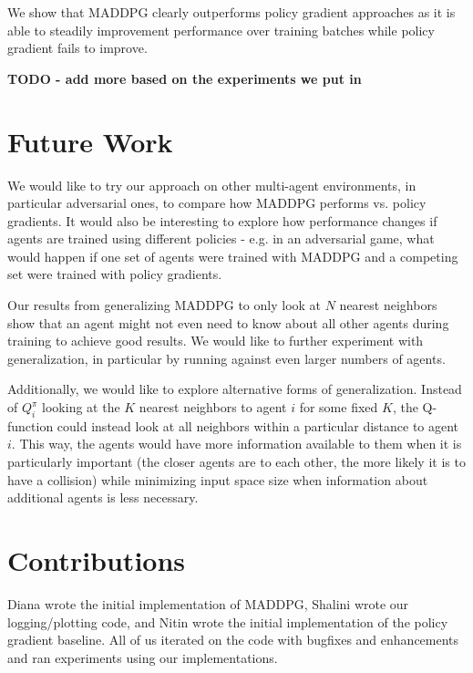 \documentclass{article}
\begin{document}
We show that MADDPG clearly outperforms policy gradient approaches as it is able to steadily improvement performance over training batches while policy gradient fails to improve. 

\textbf{TODO - add more based on the experiments we put in} 


\section{Future Work}
We would like to try our approach on other multi-agent environments, in particular adversarial ones, to compare how MADDPG performs vs. policy gradients. It would also be interesting to explore how performance changes if agents are trained using different policies - e.g. in an adversarial game, what would happen if one set of agents were trained with MADDPG and a competing set were trained with policy gradients.

Our results from generalizing MADDPG to only look at $N$ nearest neighbors show that an agent might not even need to know about all other agents during training to achieve good results. We would like to further experiment with generalization, in particular by running against even larger numbers of agents.

Additionally, we would like to explore alternative forms of generalization. Instead of $Q^\pi_i$ looking at the $K$ nearest neighbors to agent $i$ for some fixed $K$, the Q-function could instead look at all neighbors within a particular distance to agent $i$. This way, the agents would have more information available to them when it is particularly important (the closer agents are to each other, the more likely it is to have a collision) while minimizing input space size when information about additional agents is less necessary.

\section*{Contributions}
Diana wrote the initial implementation of MADDPG, Shalini wrote our logging/plotting code, and Nitin wrote the initial implementation of the policy gradient baseline. All of us iterated on the code with bugfixes and enhancements and ran experiments using our implementations.



\end{document}
